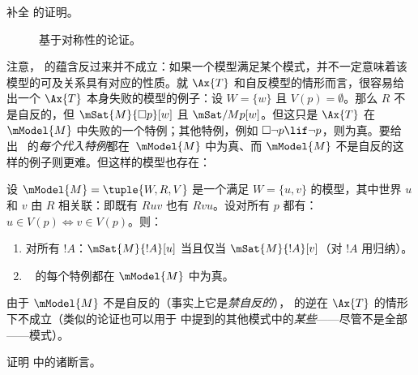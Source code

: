 \documentclass[../../../include/open-logic-section]{subfiles}
\begin{document}
\begin{prob}
  补全  的证明。
\end{prob}

\begin{figure}
  \begin{center}
  \end{center}
\caption{基于对称性的论证。}
\end{figure}

注意， 的蕴含反过来并不成立：如果一个模型满足某个模式，并不一定意味着该模型的可及关系具有对应的性质。就 $\Ax{T}$ 和自反模型的情形而言，很容易给出一个 $\Ax{T}$ 本身失败的模型的例子：设 $W = \{w\}$ 且 $V(p) = \emptyset$。那么 $R$ 不是自反的，但 $\mSat{M}{\Box p}[w]$ 且 $\mSat/{M}{p}[w]$。但这只是 $\Ax{T}$ 在~$\mModel{M}$ 中失败的一个特例；其他特例，例如 $\Box \lnot p \lif \lnot p$，则为真。要给出~ 的\emph{每个代入特例}都在~$\mModel{M}$ 中为真、而 $\mModel{M}$ 不是自反的这样的例子则更难。但这样的模型也存在：

\begin{prop}
  设 $\mModel{M} = \tuple{W, R, V}$ 是一个满足 $W = \{u, v\}$ 的模型，其中世界 $u$ 和 $v$ 由 $R$ 相关联：即既有 $Ruv$ 也有 $Rvu$。设对所有 $p$ 都有：$u \in V(p) \Leftrightarrow v \in V(p)$。则：
  \begin{enumerate}
  \item 对所有 $!A$：$\mSat{M}{!A}[u]$ 当且仅当
    $\mSat{M}{!A}[v]$（对 $!A$ 用归纳）。
  \item ~ 的每个特例都在 $\mModel{M}$ 中为真。
  \end{enumerate}
  由于 $\mModel{M}$ 不是自反的（事实上它是\emph{禁自反的}）， 的逆在 $\Ax{T}$ 的情形下不成立（类似的论证也可以用于  中提到的其他模式中的\emph{某些}——尽管不是全部——模式）。
\end{prop}

\begin{prob}
  证明  中的诸断言。
\end{prob}
\end{document}
